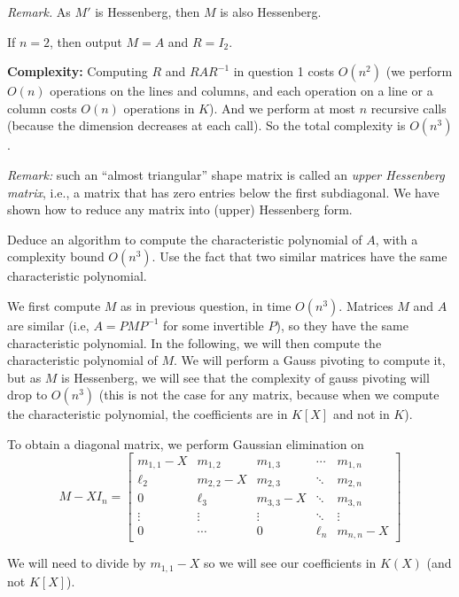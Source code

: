 \documentclass[11pt]{exam}
\theoremstyle{definition}
\begin{document}
{\begin{questions}
\begin{solution}
		\textit{Remark.} As $M'$ is Hessenberg, then $M$ is also Hessenberg.
		
		If $n = 2$, then output $M = A$ and $R = I_2$.
		
		\textbf{Complexity:} Computing $R$ and $RAR^{-1}$ in question 1 costs $O(n^2)$ (we perform $O(n)$ operations on the lines and columns, and each operation on a line or a column costs $O(n)$ operations in $K$). And we perform at most $n$ recursive calls (because the dimension decreases at each call). So the total complexity is $O(n^3)$.
		
	\end{solution}
	
	\emph{Remark:} such an ``almost triangular'' shape matrix is called an \emph{upper Hessenberg matrix}, i.e., a matrix that has zero entries below the first subdiagonal. We have shown how to reduce any matrix into (upper)
	Hessenberg form.
	
	
	\question Deduce an algorithm to compute the characteristic polynomial of $A$, with a complexity bound $O(n^3)$. Use the fact that two similar matrices have the same characteristic polynomial.
	
	\begin{solution}
		We first compute $M$ as in previous question, in time $O(n^3)$. Matrices $M$ and $A$ are similar (i.e, $A=PMP^{-1}$ for some invertible $P$), so they have the same characteristic polynomial. In the following, we will then compute the characteristic polynomial of $M$. We will perform a Gauss pivoting to compute it, but as $M$ is Hessenberg, we will see that the complexity of gauss pivoting will drop to $O(n^3)$ (this is not the case for any matrix, because when we compute the characteristic polynomial, the coefficients are in $K[X]$ and not in $K$).
		
		To obtain a diagonal matrix, we perform Gaussian elimination on 
		$$M-XI_n
		= \begin{bmatrix} m_{1,1}-X & m_{1,2} & m_{1,3} & \cdots & m_{1,n} \\
		\ell_2 & m_{2,2}-X & m_{2,3} & \ddots & m_{2,n} \\
		0 & \ell_3 & m_{3,3}-X & \ddots & m_{3,n} \\
		\vdots & \vdots & \vdots & \ddots & \vdots \\
		0 & \cdots & 0 & \ell_n & m_{n,n}-X
		\end{bmatrix}$$
		
		We will need to divide by $m_{1,1}-X$ so we will see our coefficients in $K(X)$ (and not $K[X]$).
		

\end{solution}
\end{questions}}
\end{document}
